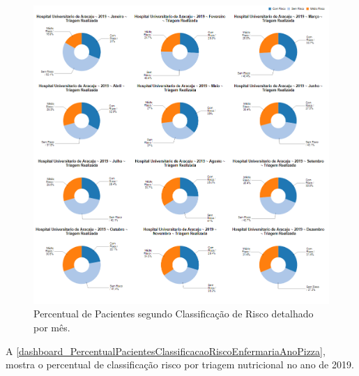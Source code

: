 \begin{figure}[htb]
	\caption{\label{dashboard_PercentualPacientesClassificacaoRiscoHospitalMesPizza}Percentual de Pacientes segundo Classificação de Risco detalhado por mês.}
	\begin{center}
	    \includegraphics[scale=0.6]{Imagens/2.2.PercentualPacientesClassificacaoRiscoHospitalMesPizza.png}
	\end{center}
\end{figure}

\clearpage
A \autoref{dashboard_PercentualPacientesClassificacaoRiscoEnfermariaAnoPizza}, mostra o percentual de classificação risco por triagem nutricional no ano de 2019.

